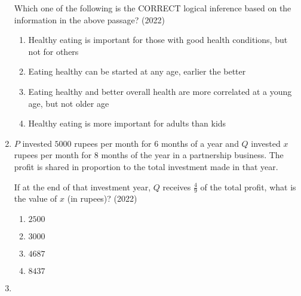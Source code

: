 \documentclass[journal]{IEEEtran}
\begin{document}
\begin{enumerate}
Which one of the following is the CORRECT logical inference based on the information in the above passage? \hfill(2022)
\begin{enumerate}
\item Healthy eating is important for those with good health conditions, but not for others
\item Eating healthy can be started at any age, earlier the better
\item Eating healthy and better overall health are more correlated at a young age, but not older age
\item Healthy eating is more important for adults than kids
\end{enumerate}


\item $P$ invested $5000$ rupees per month for $6$ months of a year and $Q$ invested $x$ rupees per month for $8$ months of the year in a partnership business. The profit is shared in proportion to the total investment made in that year.

If at the end of that investment year, $Q$ receives $\frac{4}{9}$ of the total profit, what is the value of $x$ (in rupees)? \hfill(2022)
\begin{multicols}{2}
\begin{enumerate}
\item $2500$
\item $3000$
\item $4687$
\item $8437$
\end{enumerate}
\end{multicols}


\item {}


\end{enumerate}
\end{document}
